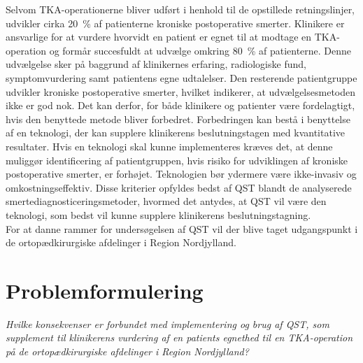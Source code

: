 Selvom TKA-operationerne bliver udført i henhold til de opstillede retningslinjer, udvikler cirka 20~\% af patienterne kroniske postoperative smerter. Klinikere er ansvarlige for at vurdere hvorvidt en patient er egnet til at modtage en TKA-operation og formår succesfuldt at udvælge omkring 80~\% af patienterne. Denne udvælgelse sker på baggrund af klinikernes erfaring, radiologiske fund, symptomvurdering samt patientens egne udtalelser. Den resterende patientgruppe udvikler kroniske postoperative smerter, hvilket indikerer, at udvælgelsesmetoden ikke er god nok. Det kan derfor, for både klinikere og patienter være fordelagtigt, hvis den benyttede metode bliver forbedret. Forbedringen kan bestå i benyttelse af en teknologi, der kan supplere klinikerens beslutningstagen med kvantitative resultater. Hvis en teknologi skal kunne implementeres kræves det, at denne muliggør identificering af patientgruppen, hvis risiko for udviklingen af kroniske postoperative smerter, er forhøjet. Teknologien bør ydermere være ikke-invasiv og omkostningseffektiv. Disse kriterier opfyldes bedst af QST blandt de analyserede smertediagnosticeringsmetoder, hvormed det antydes, at QST vil være den teknologi, som bedst vil kunne supplere klinikerens beslutningstagning. \\
For at danne rammer for undersøgelsen af QST vil der blive taget udgangspunkt i de ortopædkirurgiske afdelinger i Region Nordjylland. 

\section{Problemformulering}
\begin{center}
	\textit{Hvilke konsekvenser er forbundet med implementering og brug af QST, som supplement til klinikerens vurdering af en patients egnethed til en TKA-operation på de ortopædkirurgiske afdelinger i Region Nordjylland?}
\end{center}